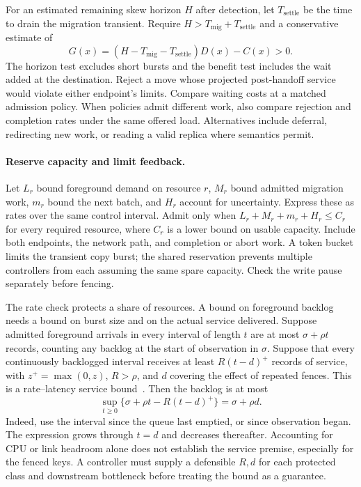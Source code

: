 \documentclass[manuscript]{acmart}
\begin{document}
For an estimated remaining skew horizon \(H\) after detection, let \(T_{\mathrm{settle}}\) be the time to drain the migration transient. Require \(H>T_{\mathrm{mig}}+T_{\mathrm{settle}}\) and a conservative estimate of
\[
  G(x)=(H-T_{\mathrm{mig}}-T_{\mathrm{settle}})D(x)-C(x)>0.
\]
The horizon test excludes short bursts and the benefit test includes the wait added at the destination. Reject a move whose projected post-handoff service would violate either endpoint's limits. Compare waiting costs at a matched admission policy. When policies admit different work, also compare rejection and completion rates under the same offered load. Alternatives include deferral, redirecting new work, or reading a valid replica where semantics permit.

\paragraph{Reserve capacity and limit feedback.}
Let \(L_r\) bound foreground demand on resource \(r\), \(M_r\) bound admitted migration work, \(m_r\) bound the next batch, and \(H_r\) account for uncertainty. Express these as rates over the same control interval. Admit only when \(L_r+M_r+m_r+H_r\le C_r\) for every required resource, where \(C_r\) is a lower bound on usable capacity. Include both endpoints, the network path, and completion or abort work. A token bucket limits the transient copy burst; the shared reservation prevents multiple controllers from each assuming the same spare capacity. Check the write pause separately before fencing.

The rate check protects a share of resources. A bound on foreground backlog needs a bound on burst size and on the actual service delivered. Suppose admitted foreground arrivals in every interval of length \(t\) are at most \(\sigma+\rho t\) records, counting any backlog at the start of observation in \(\sigma\). Suppose that every continuously backlogged interval receives at least \(R(t-d)^+\) records of service, with \(z^+=\max(0,z)\), \(R>\rho\), and \(d\) covering the effect of repeated fences. This is a rate--latency service bound~\cite{leboudec2001networkcalculus}. Then the backlog is at most
\[
\sup_{t\ge 0}\{\sigma+\rho t-R(t-d)^+\}=\sigma+\rho d .
\]
Indeed, use the interval since the queue last emptied, or since observation began. The expression grows through \(t=d\) and decreases thereafter. Accounting for CPU or link headroom alone does not establish the service premise, especially for the fenced keys. A controller must supply a defensible \(R,d\) for each protected class and downstream bottleneck before treating the bound as a guarantee.
\end{document}
